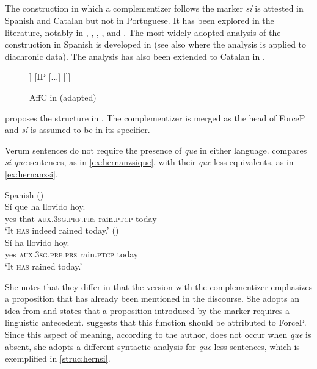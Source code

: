 \subsection{\citet{Hernanz2007}}
The construction in which a complementizer follows the  marker \emph{sí} is attested in Spanish and Catalan but not in Portuguese. It has been explored in the literature, notably  in \citet{Martins2006, Martins2013}, \citet{GonzalezRodriguez2008, GonzalezRodriguez2009,  GonzalezRodriguez2016} \citet{Escandell-Vidal2009}, \citet{Escandell-Vidal2009a}, \citet{Escandell-Vidal2011}, \citet{RodriguezMolina2014} and  \citet{VillaGarcia2020b, VillaGarcia2020a}. The most widely adopted analysis of the  construction in Spanish is developed in   \citet{Hernanz2007} (see also \citealt{Batllori2008} where the  analysis is applied to diachronic data). The analysis has also been extended to Catalan in \citet{Batllori2013}.  


\begin{figure}
  \caption{\label{struc:hernsique}AffC in \citet[144: ex 87]{Hernanz2007} (adapted)}
  \begin{forest}
	[ForceP
	[\emph{sí}]
	[Force' 
	[Force$^0$ 
	[que]]
	[IP
	[...] 	
	]]]
  \end{forest}
\end{figure}

\citet{Hernanz2007}  proposes the structure in . The complementizer is merged as  the head of ForceP and \textit{sí} is assumed to be in its specifier. 

Verum sentences do not require the presence of \emph{que} in either language. \citet{Hernanz2007} compares \emph{sí que}-sentences, as in  \eqref{ex:hernanzsique}, with their \emph{que}-less equivalents, as in \eqref{ex:hernanzsi}. 

\ea Spanish 
\ea\label{ex:hernanzsique}
		(\citealt[134: ex 3a]{Hernanz2007})\\
\gll Sí que ha llovido hoy. \\
yes that \textsc{aux.3sg.prf.prs} rain.\textsc{ptcp} today\\
\glt `It \textsc{has} indeed rained today.' 
\ex\label{ex:hernanzsi} 
(\citealt[134: ex 1a]{Hernanz2007})\\
\gll Sí ha llovido hoy. \\
yes \textsc{aux.3sg.prf.prs} rain.\textsc{ptcp} today\\
\glt `It \textsc{has} rained today.' 
\z
\z


She notes that they differ in that the version with the complementizer  emphasizes a proposition that has already been mentioned in the discourse. She adopts an idea from \citet{Etxepare1997} and states that a proposition introduced by the  marker requires a linguistic antecedent. \citet{Hernanz2007} suggests that this function should be attributed  to ForceP. Since this aspect of meaning, according to the author, does not occur when  \emph{que} is absent, she adopts a different syntactic analysis for  \emph{que}-less  sentences, which is exemplified in \eqref{struc:hernsi}.

